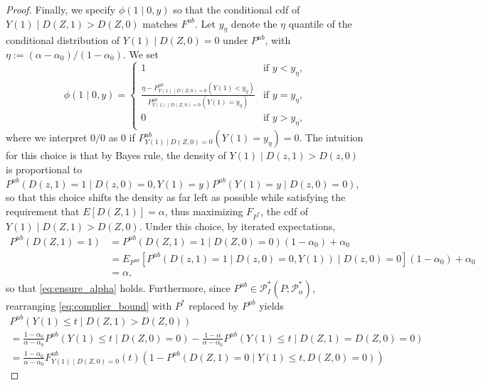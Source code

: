 \documentclass[12pt]{article}%
\theoremstyle{definition}
\newcommand\1{\operatorname{I}\indicatorfence}
\begin{document}
\begin{appendices}
\begin{proof}
  Finally, we specify $\phi(1\mid 0,y)$ so that the conditional cdf of
  $Y(1)\mid D(Z,1)>D(Z,0)$ matches $F^{ub}$. Let $y_{\eta}$ denote the $\eta$
  quantile of the conditional distribution of $Y(1)\mid D(Z,0)=0$ under
  $P^{ub}$, with $\eta:=(\alpha-\alpha_{0})/(1-\alpha_{0})$. We set
  \begin{equation}\label{eq:dz1_definition}
    \phi(1\mid 0, y)=
    \begin{cases}
      1 & \text{if $y < y_{\eta}$,} \\
      \frac{\eta-P^{ub}_{Y(1)\mid D(Z,0)=0}(Y(1)<y_\eta)}{
      P^{ub}_{Y(1)\mid D(Z,0)=0}(Y(1)=y_\eta)} & \text{if $y=y_\eta$,}\\
      0 & \text{if $y>y_{\eta}$,}
    \end{cases}
  \end{equation}
  where we interpret $0/0$ as $0$ if
  $P^{ub}_{Y(1)\mid D(Z,0)=0}(Y(1)=y_\eta)=0$. The intuition for this choice is
  that by Bayes rule, the density of $Y(1)\mid D(z,1)>D(z,0)$ is proportional to
  $P^{ub}(D(z, 1)=1\mid D(z, 0)=0, Y(1)=y) P^{ub}(Y(1)=y \mid D(z,0) =0)$, so that this choice
  shifts the density as far left as possible while satisfying the requirement
  that $E[D(Z,1)]=\alpha$, thus maximizing $F_{P^{*}}$, the cdf of
  $Y(1) \mid D(Z,1) > D(Z,0)$. Under this choice, by iterated expectations,
  \begin{equation*}
    \begin{split}
      P^{ub}(D(Z,1)=1)& = P^{ub}(D(Z,1)=1\mid D(Z,0)=0)(1-\alpha_{0})+\alpha_{0}\\
                      & =E_{P^{ub}}[P^{ub}(D(z, 1)=1\mid D(z, 0)=0, Y(1))\mid D(z, 0)=0] (1-\alpha_{0})+\alpha_{0}\\
                      &=\alpha,
    \end{split}
  \end{equation*}
  so that
  \cref{eq:ensure_alpha} holds. Furthermore, since
  $P^{ub}\in \mathcal{P}^*_{I}(P; \mathcal{P}^*_{\alpha})$, rearranging
  \cref{eq:complier_bound} with $P^{*}$ replaced by $P^{ub}$ yields
  \begin{multline*}
    P^{ub}(Y(1) \leq t \mid D(Z,1)> D(Z,0))\\
    =
    \frac{1-\alpha_{0}}{\alpha-\alpha_{0}}P^{ub}(Y(1) \leq t \mid D(Z,0) =0)-
    \frac{1-\alpha}{\alpha-\alpha_{0}}P^{ub}(Y(1) \leq t \mid D(Z,1)=D(Z,0) =0)\\
    =
    \frac{1-\alpha_{0}}{\alpha-\alpha_{0}}F^{ub}_{Y(1)\mid D(Z,0)=0}(t)\left(
      1- P^{ub}(D(Z,1)=0 \mid Y(1) \leq t, D(Z,0) =0)\right)

\end{multline*}
\end{proof}
\end{appendices}
\end{document}

